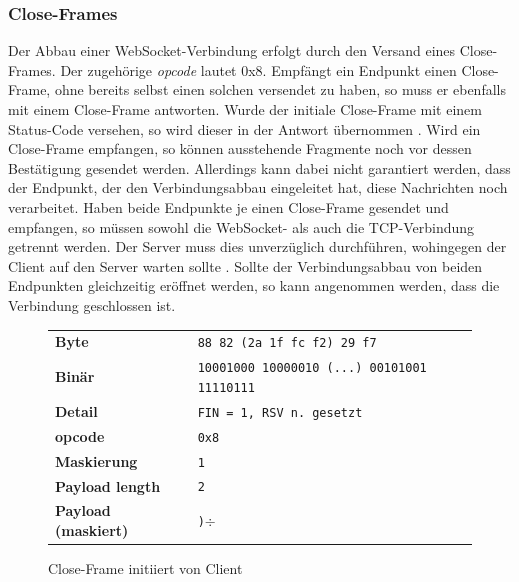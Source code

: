 \documentclass[11pt,a4paper,titlepage]{scrartcl}
\numberwithin{equation}{section}
\begin{document}
\subsubsection*{Close-Frames}
Der Abbau einer WebSocket-Verbindung erfolgt durch den Versand eines Close-Frames. Der zugehörige \textit{opcode} lautet 0x8. Empfängt ein Endpunkt einen Close-Frame, ohne bereits selbst einen solchen versendet zu haben, so muss er ebenfalls mit einem Close-Frame antworten. Wurde der initiale Close-Frame mit einem Status-Code versehen, so wird dieser in der Antwort übernommen \autocite[35]{fette_websocket_2011}. Wird ein Close-Frame empfangen, so können ausstehende Fragmente noch vor dessen Bestätigung gesendet werden. Allerdings kann dabei nicht garantiert werden, dass der Endpunkt, der den Verbindungsabbau eingeleitet hat, diese Nachrichten noch verarbeitet. Haben beide Endpunkte je einen Close-Frame gesendet und empfangen, so müssen sowohl die WebSocket- als auch die TCP-Verbindung getrennt werden. Der Server muss dies unverzüglich durchführen, wohingegen der Client auf den Server warten sollte \autocite[36]{fette_websocket_2011}. Sollte der Verbindungsabbau von beiden Endpunkten gleichzeitig eröffnet werden, so kann angenommen werden, dass die Verbindung geschlossen ist.\\ 

\begin{figure}[ht]
	\begin{center}
		\begin{tabular}{l>{\arraybackslash}p{9.0cm}}
			\textbf{Byte} & \texttt{88 82 (2a 1f fc f2) 29 f7}  \\
			\textbf{Binär} & \texttt{10001000 10000010 (...) 00101001 11110111}\\
			\textbf{Detail} & \texttt{FIN = 1, RSV n. gesetzt} \\
			\textbf{opcode} & \texttt{0x8} \\ 
			\textbf{Maskierung} & \texttt{1}\\ 
			\textbf{Payload length} & \texttt{2}\\ 
			\textbf{Payload (maskiert)} & \texttt{)$\div$}\\
		\end{tabular}
	\end{center}
	\caption{Close-Frame initiiert von Client}
	\label{fig:wsCloseFrameClient}
\end{figure}
\end{document}

